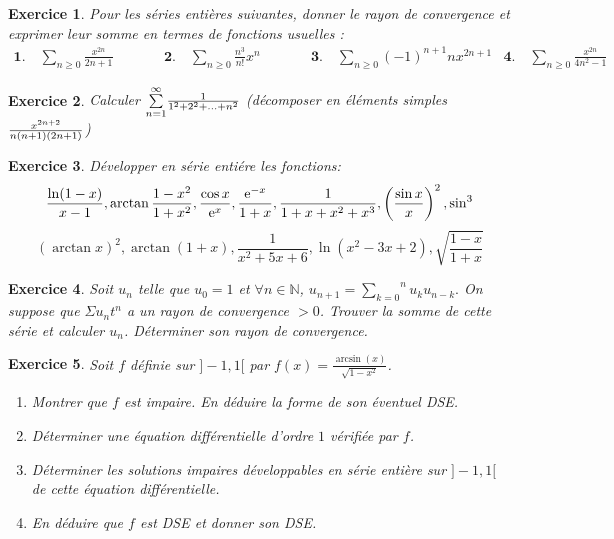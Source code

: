 \documentclass[12pt,a4paper]{article}
\newcommand{\N}{\mathbb{N}}
\newcommand{\E}{\mathrm{e}}
\theoremstyle{break}
\theoremstyle{break}
\newtheorem{Exo}{Exercice}
\begin{document}
\begin{Exo}
	Pour les séries entières suivantes, donner le rayon de convergence et exprimer leur somme en termes de fonctions
usuelles :
$$\begin{array}{llllll}
	\mathbf{1.}\quad \sum_{n\geq 0}\frac{x^{2n}}{2n+1}&\quad\quad&\mathbf{2.}\quad \sum_{n\geq 0}\frac{n^3}{n!}x^n&\quad\quad&\mathbf{3.}\quad \sum_{n\geq 0}(-1)^{n+1} nx^{2n+1}&
	\mathbf{4.}\quad \sum_{n\geq 0}\frac{x^{2n}}{4n^2-1}
\end{array}$$

\end{Exo}





\begin{Exo}
	 Calculer $\overset{\infty }{\underset{n=1}{\sum }}\frac{1}{%
	1^{2}+2^{2}+...+n^{2}}$ (décomposer en éléments simples $\frac{%
	x^{2n+2}}{n(n+1)(2n+1)}$)
\end{Exo}

 \begin{Exo}
	Développer en série entiére les fonctions: 
\begin{equation*}
	\frac{\ln (1-x)}{x-1},\arctan \frac{1-x^{2}}{1+x^{2}},\frac{\cos x}{\E^x},\frac{%
		\E^{-x}}{1+x},\frac{1}{1+x+x^{2}+x^{3}},\left( \frac{\sin x}{x}\right)
	^{2},\sin^3 
\end{equation*}%
\begin{equation*}
	\left( \arctan x\right) ^{2},\arctan (1+x),\frac{1}{x^2+5x+6},\ln(x^2-3x+2),\sqrt{\frac{1-x}{1+x}}
\end{equation*}
\end{Exo}



\begin{Exo}
	 Soit $u_n$ telle que $u_{0}=1$ et $\forall n\in \N$, $u_{n+1}=\overset{n}{\underset{k=0}{\sum }}u_{k}u_{n-k}.$ On suppose que  $\Sigma u_{n}t^{n}$ a un rayon de convergence $>0$.
Trouver la somme de cette série et calculer $u_{n}$. Déterminer son
rayon de convergence.
\end{Exo}

 \begin{Exo}
	Soit $f$ définie sur $]-1,1[$ par $f(x)=\frac{\arcsin(x)}{\sqrt{1-x^2}}$.
\begin{enumerate}
	\item
	Montrer que $f$ est impaire. En déduire la forme de son éventuel DSE.
	\item
	Déterminer une équation différentielle d'ordre $1$ vérifiée par $f$.
	\item
	Déterminer les solutions impaires développables en série entière sur $]-1,1[$  de cette équation différentielle.
	\item En déduire que $f$ est DSE et donner son DSE.
\end{enumerate}
\end{Exo}
\end{document}
